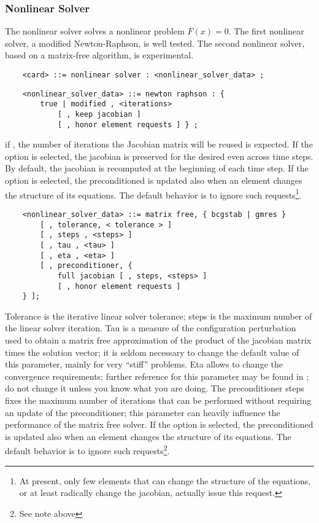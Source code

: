 \subsubsection{Nonlinear Solver}
The nonlinear solver solves a nonlinear problem $F(x)=0$.
The first nonlinear solver, a modified Newton-Raphson, 
is well tested. The second nonlinear solver, based on a
matrix-free algorithm, is experimental.
\begin{verbatim}
    <card> ::= nonlinear solver : <nonlinear_solver_data> ;
\end{verbatim}
\begin{verbatim}
    <nonlinear_solver_data> ::= newton raphson : { 
        true | modified , <iterations>
            [ , keep jacobian ]
            [ , honor element requests ] } ;
\end{verbatim}
if , the number of iterations the Jacobian matrix will be
reused is expected.
If the option  is selected, the jacobian is preserved
for the desired  even across time steps.
By default, the jacobian is recomputed at the beginning of each time step.
If the option  is selected, the preconditioned
is updated also when an element changes the structure of its equations.
The default behavior is to ignore such requests\footnote{
	At present, only few elements that can change the structure
	of the equations, or at least radically change the jacobian,
	actually issue this request.
}.
\begin{verbatim}
    <nonlinear_solver_data> ::= matrix free, { bcgstab | gmres }
        [ , tolerance, < tolerance > ]
        [ , steps , <steps> ]
        [ , tau , <tau> ]
        [ , eta , <eta> ]
        [ , preconditioner, {
            full jacobian [ , steps, <steps> ] 
	        [ , honor element requests ]
    } ];
\end{verbatim}
Tolerance is the iterative linear solver tolerance;
steps is the maximum number of the linear solver iteration.
Tau is a measure of the configuration perturbation used
to obtain a matrix free approximation of the product
of the jacobian matrix times the solution vector;
it is seldom necessary to change the default value of this parameter,
mainly for very ``stiff'' problems.
Eta allows to change the convergence requirements; further reference for
this parameter may be found in \cite{KELLEY-1995}; do not change it
unless you know what you are doing.
The preconditioner steps fixes the maximum number of
iterations that can be performed without requiring
an update of the preconditioner; this parameter can heavily influence
the performance of the matrix free solver.
If the option  is selected, the preconditioned
is updated also when an element changes the structure of its equations.
The default behavior is to ignore such requests\footnote{See note above}.


